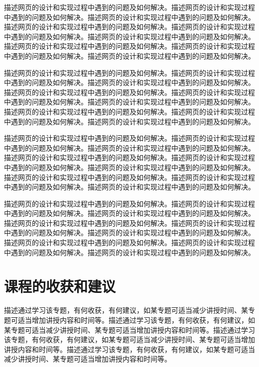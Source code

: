 \documentclass[supercite]{Experimental_Report}
\theoremstyle{definition}
\begin{document}
描述网页的设计和实现过程中遇到的问题及如何解决。描述网页的设计和实现过程中遇到的问题及如何解决。描述网页的设计和实现过程中遇到的问题及如何解决。描述网页的设计和实现过程中遇到的问题及如何解决。描述网页的设计和实现过程中遇到的问题及如何解决。描述网页的设计和实现过程中遇到的问题及如何解决。描述网页的设计和实现过程中遇到的问题及如何解决。描述网页的设计和实现过程中遇到的问题及如何解决。描述网页的设计和实现过程中遇到的问题及如何解决。

描述网页的设计和实现过程中遇到的问题及如何解决。描述网页的设计和实现过程中遇到的问题及如何解决。描述网页的设计和实现过程中遇到的问题及如何解决。描述网页的设计和实现过程中遇到的问题及如何解决。描述网页的设计和实现过程中遇到的问题及如何解决。描述网页的设计和实现过程中遇到的问题及如何解决。描述网页的设计和实现过程中遇到的问题及如何解决。描述网页的设计和实现过程中遇到的问题及如何解决。描述网页的设计和实现过程中遇到的问题及如何解决。

描述网页的设计和实现过程中遇到的问题及如何解决。描述网页的设计和实现过程中遇到的问题及如何解决。描述网页的设计和实现过程中遇到的问题及如何解决。描述网页的设计和实现过程中遇到的问题及如何解决。描述网页的设计和实现过程中遇到的问题及如何解决。描述网页的设计和实现过程中遇到的问题及如何解决。描述网页的设计和实现过程中遇到的问题及如何解决。描述网页的设计和实现过程中遇到的问题及如何解决。描述网页的设计和实现过程中遇到的问题及如何解决。

描述网页的设计和实现过程中遇到的问题及如何解决。描述网页的设计和实现过程中遇到的问题及如何解决。描述网页的设计和实现过程中遇到的问题及如何解决。描述网页的设计和实现过程中遇到的问题及如何解决。描述网页的设计和实现过程中遇到的问题及如何解决。描述网页的设计和实现过程中遇到的问题及如何解决。描述网页的设计和实现过程中遇到的问题及如何解决。描述网页的设计和实现过程中遇到的问题及如何解决。描述网页的设计和实现过程中遇到的问题及如何解决。

\newpage

\section{课程的收获和建议}

描述通过学习该专题，有何收获，有何建议，如某专题可适当减少讲授时间、某专题可适当增加讲授内容和时间等。描述通过学习该专题，有何收获，有何建议，如某专题可适当减少讲授时间、某专题可适当增加讲授内容和时间等。描述通过学习该专题，有何收获，有何建议，如某专题可适当减少讲授时间、某专题可适当增加讲授内容和时间等。描述通过学习该专题，有何收获，有何建议，如某专题可适当减少讲授时间、某专题可适当增加讲授内容和时间等。
\end{document}
